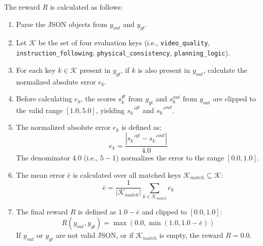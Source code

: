 The reward $R$ is calculated as follows:
\begin{enumerate}
    \item Parse the JSON objects from $y_{out}$ and $y_{gt}$.
    \item Let $\mathcal{K}$ be the set of four evaluation keys (i.e., \texttt{video\_quality}, \texttt{instruction\_following}, \texttt{physical\_consistency}, \texttt{planning\_logic}).
    \item For each key $k \in \mathcal{K}$ present in $y_{gt}$, if $k$ is also present in $y_{out}$, calculate the normalized absolute error $e_k$.
    \item Before calculating $e_k$, the scores $s_k^{gt}$ from $y_{gt}$ and $s_k^{out}$ from $y_{out}$ are clipped to the valid range $[1.0, 5.0]$, yielding $s_k'^{gt}$ and $s_k'^{out}$.
    \item The normalized absolute error $e_k$ is defined as:
    \begin{equation}
    e_k = \frac{|s_k'^{gt} - s_k'^{out}|}{4.0}
    \end{equation}
    The denominator 4.0 (i.e., $5-1$) normalizes the error to the range $[0.0, 1.0]$.
    \item The mean error $\bar{e}$ is calculated over all matched keys $\mathcal{K}_{match} \subseteq \mathcal{K}$:
    \begin{equation}
    \bar{e} = \frac{1}{|\mathcal{K}_{match}|} \sum_{k \in \mathcal{K}_{match}} e_k
    \end{equation}
    \item The final reward $R$ is defined as $1.0 - \bar{e}$ and clipped to $[0.0, 1.0]$:
    \begin{equation}
    R(y_{out}, y_{gt}) = \max(0.0, \min(1.0, 1.0 - \bar{e}))
    \end{equation}
    If $y_{out}$ or $y_{gt}$ are not valid JSON, or if $\mathcal{K}_{match}$ is empty, the reward $R=0.0$.
\end{enumerate}

